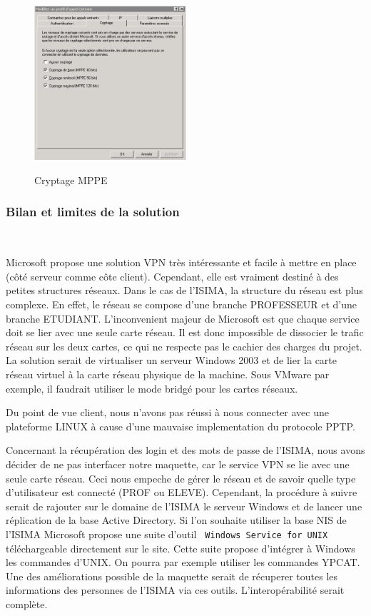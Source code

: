 \begin{figure}[H]
	\begin{center}
		\includegraphics[width=0.50\textwidth]{partie_2/screen_windows/cryptage.PNG}\\
	\end{center}
	\caption{Cryptage MPPE}
	\label{VPN_CRYPTAGE}
\end{figure}


\subsubsection{Bilan et limites de la solution}
~

Microsoft propose une solution VPN très intéressante et facile à mettre en place (côté serveur comme côte client). Cependant, elle est vraiment destiné à des petites structures réseaux. Dans le cas de l'ISIMA, la structure du réseau est plus complexe. En effet, le réseau se compose d'une branche PROFESSEUR et d'une branche ETUDIANT. L'inconvenient majeur de Microsoft est que chaque service doit se lier avec une seule carte réseau. Il est donc impossible de dissocier le trafic réseau sur les deux cartes, ce qui ne respecte pas le cachier des charges du projet. La solution serait de virtualiser un serveur Windows 2003 et de lier la carte réseau virtuel à la carte réseau physique de la machine. Sous VMware par exemple, il faudrait utiliser le mode bridgé pour les cartes réseaux.

Du point de vue client, nous n'avons pas réussi à nous connecter avec une plateforme LINUX à cause d'une mauvaise implementation du protocole PPTP.


Concernant la récupération des login et des mots de passe de l'ISIMA, nous avons décider de ne pas interfacer notre maquette, car le service VPN se lie avec une seule carte réseau. Ceci nous empeche de gérer le réseau et de savoir quelle type d'utilisateur est connecté (PROF ou ELEVE). Cependant, la procédure à suivre serait de rajouter sur le domaine de l'ISIMA le serveur Windows et de lancer une réplication de la base Active Directory. 
Si l'on souhaite utiliser la base NIS de l'ISIMA Microsoft propose une suite d'outil \verb| Windows Service for UNIX| téléchargeable directement sur le site. Cette suite propose d'intégrer à Windows les commandes d'UNIX. On pourra par exemple utiliser les commandes YPCAT. Une des améliorations possible de la maquette serait de récuperer toutes les informations des personnes de l'ISIMA via ces outils. L'interopérabilité serait complète.

